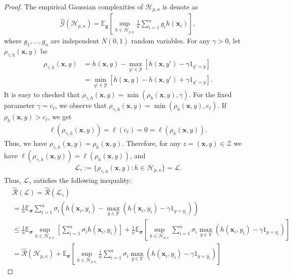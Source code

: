\documentclass[10pt]{llncs}
\begin{document}
\begin{proof}
The empirical Gaussian complexities of $\mathcal{H}_{p,\kappa}$ is denote as
\begin{align*}
  \hat{\mathcal{G}}(\mathcal{H}_{p,\kappa})=\mathbb{E}_{\bm g}\left[\sup_{h\in \mathcal{H}_{p,\kappa}}\frac{1}{n}\sum_{i=1}^ng_{i}h(\mathbf x_i)\right],
\end{align*}
where $g_1,\ldots, g_n$ are independent $N(0,1)$ random variables.
For any $\gamma>0$, let  $\rho_{\gamma,h}(\mathbf x,y)$ be
  \begin{align*}
    \rho_{\gamma,h}(\mathbf x,y)&=h(\mathbf x,y)-\max_{y'\in\mathcal{Y}}[h(\mathbf x,y')-\gamma1_{y'=y}]\\
    &=\min_{y'\in\mathcal{Y}}[h(\mathbf x,y)-h(\mathbf x,y')+\gamma1_{y'=y}].
  \end{align*}
  It is easy to checked that $\rho_{\gamma,h}(\mathbf x,y)=\min(\rho_h(\mathbf x,y),\gamma)$.
  For the fixed parameter $\gamma=c_\ell$, we observe that $\rho_{\gamma,h}(\mathbf x,y)=\min(\rho_h(\mathbf x,y),c_\ell)$.
  If $\rho_h(\mathbf x,y)>c_\ell$,
  we get
  \begin{align*}
    \ell(\rho_{\gamma,h}(\mathbf x,y))=\ell(c_\ell)=0=\ell(\rho_h(\mathbf x,y)).
  \end{align*}
  Thus, we have $\rho_{\gamma,h}(\mathbf x,y)=\rho_h(\mathbf x,y)$.
  Therefore, for any $z=(\mathbf x,y)\in\mathcal{Z}$ we have $\ell(\rho_{\gamma,h}(\mathbf x,y))=\ell(\rho_h(\mathbf x,y))$,
  and
  \begin{align*}
    \mathcal{L}_\gamma:=\{\rho_{\gamma,h}(\mathbf x,y):h\in\mathcal{H}_{p,\kappa}\}=\mathcal{L}.
  \end{align*}
  Thus,  $\mathcal{L}_\gamma$ satisfies the following inequality:
  \begin{align*}
    &\hat{\mathcal{R}}(\mathcal{L})=\hat{\mathcal{R}}(\mathcal{L}_\gamma)\\&=\frac{1}{n}\mathbb{E}_{\bm \sigma}
        \sum_{i=1}^n\sigma_i\left(h(\mathbf x_i,y_i)-\max_{y\in\mathcal{Y}}(h(\mathbf x_i,y_i)-\gamma 1_{y=y_i})\right)\\
    &\leq\frac{1}{n}\mathbb{E}_{\bm \sigma}\sup_{h\in\mathcal{H}_{p,\kappa}}\left[\sum_{i=1}^n\sigma_ih(\mathbf x_i,y_i)\right]+
    \frac{1}{n}\mathbb{E}_{\bm \sigma}\left[\sup_{h\in\mathcal{H}_{p,\kappa}}\sum_{i=1}^n\sigma_i\max_{y\in Y}(h(\mathbf x_i,y_i)-\gamma 1_{y=y_i})\right]\\
    &=\hat{\mathcal{R}}(\mathcal{H}_{p,\kappa})+\mathbb{E}_{\bm \sigma}\left[\sup_{h\in\mathcal{H}_{p,\kappa}}\frac{1}{n}\sum_{i=1}^n\sigma_i\max_{y\in Y}(h(\mathbf x_i,y_i)-\gamma 1_{y=y_i})\right]

\end{align*}
\end{proof}
\end{document}
